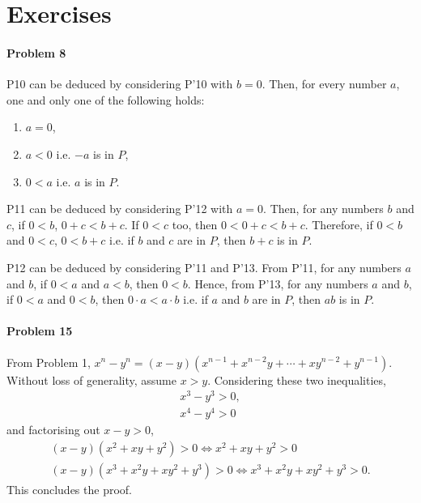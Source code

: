 \documentclass{article}
\begin{document}
\section*{Exercises}

\paragraph{Problem 8} P10 can be deduced by considering P'10 with $b = 0$.
Then, for every number $a$, one and only one of the following holds:
\begin{enumerate}
  \itemsep0em
  \item $a = 0$,
  \item $a < 0$ i.e. $-a$ is in $P$,
  \item $0 < a$ i.e. $a$ is in $P$.
\end{enumerate}

P11 can be deduced by considering P'12 with $a = 0$. Then, for any numbers $b$
and $c$, if $0 < b$, $0 + c < b + c$. If $0 < c$ too, then $0 < 0 + c < b + c$.
Therefore, if $0 < b$ and $0 < c$, $0 < b + c$ i.e. if $b$ and $c$ are in $P$,
then $b + c$ is in $P$.

P12 can be deduced by considering P'11 and P'13. From P'11, for any numbers $a$
and $b$, if $0 < a$ and $a < b$, then $0 < b$. Hence, from P'13, for any
numbers $a$ and $b$, if $0 < a$ and $0 < b$, then $0 \cdot a < a \cdot b$ i.e.
if $a$ and $b$ are in $P$, then $ab$ is in $P$.

\paragraph{Problem 15} From Problem 1, $x^n - y^n = (x - y)(x^{n-1} + x^{n-2}y
+ \cdots + xy^{n-2} + y^{n-1})$. Without loss of generality, assume $x > y$.
Considering these two inequalities, \begin{gather*}
  x^3 - y^3 > 0, \\
  x^4 - y^4 > 0
\end{gather*} and factorising out $x - y > 0$, \begin{gather*}
  (x - y)(x^2 + xy + y^2) > 0 \iff x^2 + xy + y^2 > 0 \\
  (x - y)(x^3 + x^2y + xy^2 + y^3) > 0 \iff x^3 + x^2y + xy^2 + y^3 > 0.
\end{gather*}
This concludes the proof.
\end{document}
